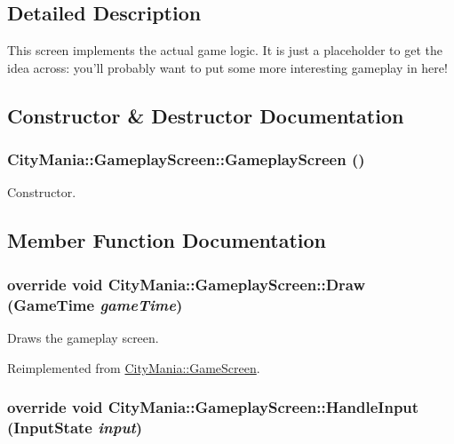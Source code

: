 \subsection{Detailed Description}
This screen implements the actual game logic. It is just a placeholder to get the idea across: you'll probably want to put some more interesting gameplay in here! 

\subsection{Constructor \& Destructor Documentation}
\hypertarget{classCityMania_1_1GameplayScreen_afcaf9cbe3f18bffb322a8d367428c05b}{
\subsubsection[{GameplayScreen}]{\setlength{\rightskip}{0pt plus 5cm}CityMania::GameplayScreen::GameplayScreen ()}}
\label{classCityMania_1_1GameplayScreen_afcaf9cbe3f18bffb322a8d367428c05b}


Constructor. 

\subsection{Member Function Documentation}
\hypertarget{classCityMania_1_1GameplayScreen_aff1697e936e9c230616cadcafbf410ee}{
\subsubsection[{Draw}]{\setlength{\rightskip}{0pt plus 5cm}override void CityMania::GameplayScreen::Draw (GameTime {\em gameTime})}}
\label{classCityMania_1_1GameplayScreen_aff1697e936e9c230616cadcafbf410ee}


Draws the gameplay screen. 

Reimplemented from \hyperlink{classCityMania_1_1GameScreen_a28fbcdba21da5e606d32d87b18bcdf29}{CityMania::GameScreen}.\hypertarget{classCityMania_1_1GameplayScreen_a3491283225749877c3325ebba7a9bd42}{
\subsubsection[{HandleInput}]{\setlength{\rightskip}{0pt plus 5cm}override void CityMania::GameplayScreen::HandleInput ({\bf InputState} {\em input})}}
\label{classCityMania_1_1GameplayScreen_a3491283225749877c3325ebba7a9bd42}


